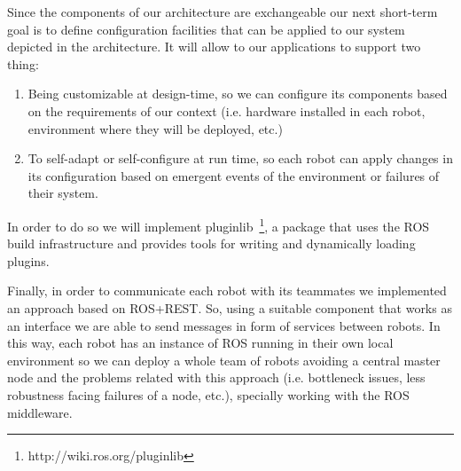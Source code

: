 Since the components of our architecture are exchangeable our next short-term goal is to define configuration facilities that can be applied to our system depicted in the architecture.
It will allow to our applications to support two thing:
\begin{enumerate}
\item Being customizable at design-time, so we can configure its components based on the requirements of our context (i.e. hardware installed in each robot, environment where they will be deployed, etc.)
\item To self-adapt or self-configure at run time, so each robot can apply changes in its configuration based on emergent events of the environment or failures of their system.
\end{enumerate}

In order to do so we will implement pluginlib~\footnote{http://wiki.ros.org/pluginlib}, a package that uses the ROS build infrastructure and provides tools for writing and dynamically loading plugins.

Finally, in order to communicate each robot with its teammates we implemented an approach based on ROS+REST.
So, using a suitable component that works as an interface we are able to send messages in form of services between robots.
In this way, each robot has an instance of ROS running in their own local environment so we can deploy a whole team of robots avoiding a central master node and the problems related with this approach (i.e. bottleneck issues, less robustness facing failures of a node, etc.), specially working with the ROS middleware.

